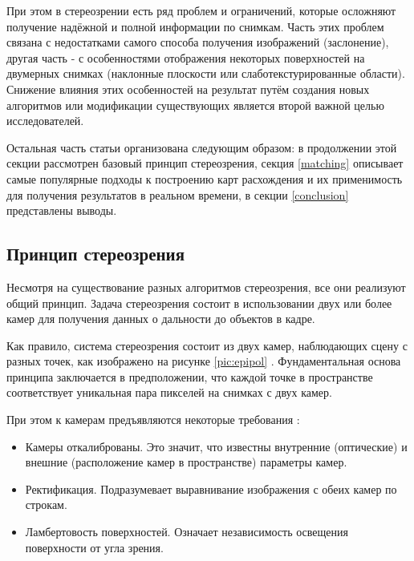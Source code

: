 При этом в стереозрении есть ряд проблем и ограничений, которые осложняют получение надёжной и полной информации по снимкам. Часть этих проблем 
связана с недостатками самого способа получения изображений (заслонение), другая часть - с особенностями отображения некоторых поверхностей на 
двумерных снимках (наклонные плоскости или слаботекстурированные области). Снижение влияния этих 
особенностей на результат путём создания новых алгоритмов или модификации существующих является второй важной целью исследователей. 

Остальная часть статьи организована следующим образом: в продолжении этой секции рассмотрен базовый принцип стереозрения, секция \ref{matching} описывает 
самые популярные подходы к построению карт расхождения и их применимость для получения результатов в реальном времени, в секции \ref{conclusion} представлены выводы. 

\subsection{Принцип стереозрения}
Несмотря на существование разных алгоритмов стереозрения, все они реализуют общий принцип. Задача стереозрения 
 состоит в использовании двух или более камер для получения данных о дальности до объектов в кадре. 

Как правило, система стереозрения состоит из двух камер, наблюдающих сцену с разных точек, как изображено на рисунке \ref{pic:epipol} \cite{Hartley2004}. 
Фундаментальная основа принципа заключается в предположении, что каждой точке в пространстве соответствует уникальная пара пикселей на снимках с двух камер.  

При этом к камерам предъявляются некоторые требования \cite{rusoverview}:   %
\begin{itemize}
	\item Камеры откалиброваны. Это значит, что известны внутренние (оптические) и внешние (расположение камер в пространстве) параметры камер. 
	\item Ректификация. Подразумевает выравнивание изображения с обеих камер по строкам.  %
	\item Ламбертовость поверхностей. Означает независимость освещения поверхности от угла зрения. 
\end{itemize}

